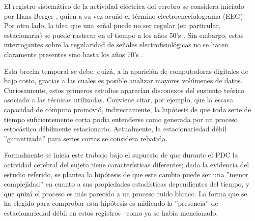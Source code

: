 \documentclass[12pt,a4paper]{mitthesis}
\begin{document}
El registro sistem\'atico de la actividad el\'ectrica del cerebro se considera iniciado por Hans 
Berger \cite{Berger29}, quien a su vez acu\~n\'o el t\'ermino electroencefalograma (EEG).
Por otro lado, la idea que una se\~nal puede no ser regular (en particular, estacionaria) se puede 
rastrear en el tiempo a los a\~nos 50’s \cite{Page52,Silverman57}. 
Sin embargo, estas interrogantes sobre la regularidad de se\~nales electrofisiol\'ogicas no se 
hacen claramente presentes sino hasta los a\~nos 70's \cite{Kawabata73,McEwen75,Cohen77,Sugimoto78}.

Esta brecha temporal se debe, quiz\'a, a la aparici\'on de computadoras digitales de bajo costo, 
gracias a las cuales es posible analizar mayores vol\'umenes de datos.
Curiosamente, estos primeros estudios aparec\'ian disconexos del sustento te\'orico asociado a las 
t\'ecnicas  utilizadas. Conviene citar, por ejemplo, que la escasa capacidad de c\'omputo 
promovi\'o, indirectamente, la hip\'otesis de que {toda} serie de tiempo suficientemente corta 
pod\'ia entenderse como generada por un proceso estoc\'astico d\'ebilmente estacionario.
Actualmente, la estacionariedad d\'ebil ''garantizada'' para series cortas se considera rebatida\cite{Melard89,Adak98,Klonowski09}.

Formalmente se inicia
este trabajo bajo el supuesto de que durante el PDC la actividad cerebral
del sujeto tiene caracter\'isticas diferentes; 
dada la evidencia del estudio referido, se plantea la hip\'otesis de que este cambio puede ser
una ''menor complejidad'' en cuanto a sus propiedades estad\'isticas 
dependientes del tiempo, y que quiz\'a el proceso es m\'as parecido a un proceso ruido blanco.
La forma que se ha elegido para comprobar esta hip\'otesis es midiendo la ''presencia'' de
estacionariedad d\'ebil en estos registros --como ya se hab\'ia mencionado.
\end{document}
